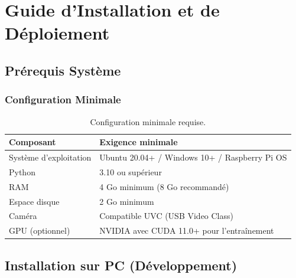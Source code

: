 \documentclass[12pt,a4paper,twoside]{report}
\begin{document}



\appendix

\chapter{Guide d'Installation et de Déploiement}

\section{Prérequis Système}

\subsection{Configuration Minimale}

\begin{table}[H]
\centering
\caption{Configuration minimale requise.}
\renewcommand{\arraystretch}{1.3}
\begin{tabular}{|l|l|}
\hline
\rowcolor{stellantisblue!15}
\textbf{Composant} & \textbf{Exigence minimale} \\
\hline
Système d'exploitation & Ubuntu 20.04+ / Windows 10+ / Raspberry Pi OS \\
\hline
Python & 3.10 ou supérieur \\
\hline
RAM & 4 Go minimum (8 Go recommandé) \\
\hline
Espace disque & 2 Go minimum \\
\hline
Caméra & Compatible UVC (USB Video Class) \\
\hline
GPU (optionnel) & NVIDIA avec CUDA 11.0+ pour l'entraînement \\
\hline
\end{tabular}
\end{table}

\section{Installation sur PC (Développement)}
\end{document}
